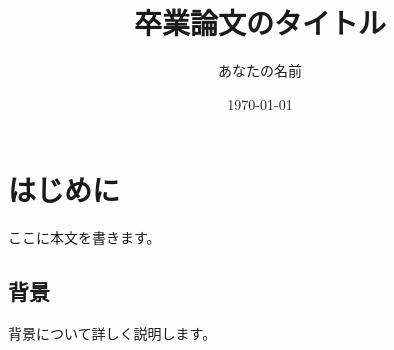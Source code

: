 \documentclass[a4paper, 12pt]{article}
\title{卒業論文のタイトル}
\author{あなたの名前}
\date{\today}
\begin{document}
\maketitle

\section{はじめに}
ここに本文を書きます。

\subsection{背景}
背景について詳しく説明します。

\end{document}
